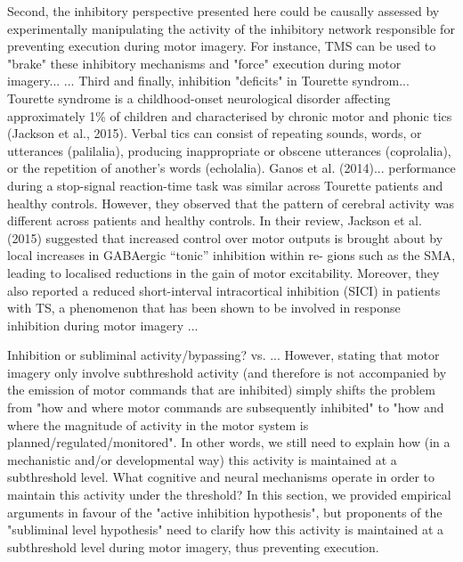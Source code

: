\documentclass[utf8]{template/frontiersSCNS} %
\begin{document}
Second, the inhibitory perspective presented here could be causally assessed by experimentally manipulating the activity of the inhibitory network responsible for preventing execution during motor imagery. For instance, TMS can be used to "brake" these inhibitory mechanisms and "force" execution during motor imagery... \citep{angelini_motor_2015, angelini_proactive_2016}... Third and finally, inhibition "deficits" in Tourette syndrom... Tourette syndrome is a childhood-onset neurological disorder affecting approximately 1\% of children and characterised by chronic motor and phonic tics (Jackson et al., 2015). Verbal tics can consist of repeating sounds, words, or utterances (palilalia), producing inappropriate or obscene utterances (coprolalia), or the repetition of another’s words (echolalia). Ganos et al. (2014)...  performance during a stop-signal reaction-time task was similar across Tourette patients and healthy controls. However, they observed that the pattern of cerebral activity was different across patients and healthy controls. In their review, Jackson et al. (2015) suggested that increased control over motor outputs is brought about by local increases in GABAergic “tonic” inhibition within re- gions such as the SMA, leading to localised reductions in the gain of motor excitability. Moreover, they also reported a reduced short-interval intracortical inhibition (SICI) in patients with TS, a phenomenon that has been shown to be involved in response inhibition during motor imagery \citep{neige_unravelling_2020}...

Inhibition or subliminal activity/bypassing? \citep{tian_mental_2012, tian_effect_2013, tian_mental_2016} vs. \cite{loevenbruck_cognitive_2018}... However, stating that motor imagery only involve subthreshold activity (and therefore is not accompanied by the emission of motor commands that are inhibited) simply shifts the problem from "how and where motor commands are subsequently inhibited" to "how and where the magnitude of activity in the motor system is planned/regulated/monitored". In other words, we still need to explain how (in a mechanistic and/or developmental way) this activity is maintained at a subthreshold level. What cognitive and neural mechanisms operate in order to maintain this activity under the threshold? In this section, we provided empirical arguments in favour of the "active inhibition hypothesis", but proponents of the "subliminal level hypothesis" need to clarify how this activity is maintained at a subthreshold level during motor imagery, thus preventing execution.
\end{document}
